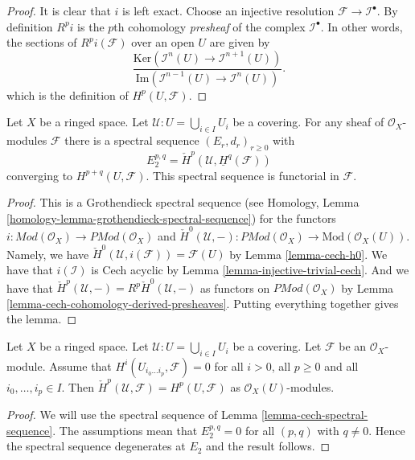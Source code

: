 \begin{proof}
It is clear that $i$ is left exact.
Choose an injective resolution $\mathcal{F} \to \mathcal{I}^\bullet$.
By definition $R^pi$ is the $p$th cohomology {\it presheaf}
of the complex $\mathcal{I}^\bullet$. In other words, the
sections of $R^pi(\mathcal{F})$ over an open $U$ are given by
$$
\frac{\text{Ker}(\mathcal{I}^n(U) \to \mathcal{I}^{n + 1}(U))}
{\text{Im}(\mathcal{I}^{n - 1}(U) \to \mathcal{I}^n(U))}.
$$
which is the definition of $H^p(U, \mathcal{F})$.
\end{proof}

\begin{lemma}
\label{lemma-cech-spectral-sequence}
Let $X$ be a ringed space.
Let $\mathcal{U} : U = \bigcup_{i \in I} U_i$ be a covering.
For any sheaf of $\mathcal{O}_X$-modules $\mathcal{F}$ there
is a spectral sequence $(E_r, d_r)_{r \geq 0}$ with
$$
E_2^{p, q} = \check{H}^p(\mathcal{U}, \underline{H}^q(\mathcal{F}))
$$
converging to $H^{p + q}(U, \mathcal{F})$.
This spectral sequence is functorial in $\mathcal{F}$.
\end{lemma}

\begin{proof}
This is a Grothendieck spectral sequence
(see Homology, Lemma \ref{homology-lemma-grothendieck-spectral-sequence})
for the functors
$i :  \textit{Mod}(\mathcal{O}_X) \to \textit{PMod}(\mathcal{O}_X)$
and
$\check{H}^0(\mathcal{U}, - ) : \textit{PMod}(\mathcal{O}_X)
\to \text{Mod}(\mathcal{O}_X(U))$.
Namely, we have $\check{H}^0(\mathcal{U}, i(\mathcal{F})) = \mathcal{F}(U)$
by Lemma \ref{lemma-cech-h0}. We have that $i(\mathcal{I})$ is 
Cech acyclic by Lemma \ref{lemma-injective-trivial-cech}. And we
have that $\check{H}^p(\mathcal{U}, -) = R^p\check{H}^0(\mathcal{U}, -)$
as functors on $\textit{PMod}(\mathcal{O}_X)$
by Lemma \ref{lemma-cech-cohomology-derived-presheaves}.
Putting everything together gives the lemma.
\end{proof}

\begin{lemma}
\label{lemma-cech-spectral-sequence-application}
Let $X$ be a ringed space.
Let $\mathcal{U} : U = \bigcup_{i \in I} U_i$ be a covering.
Let $\mathcal{F}$ be an $\mathcal{O}_X$-module.
Assume that $H^i(U_{i_0 \ldots i_p}, \mathcal{F}) = 0$
for all $i > 0$, all $p \geq 0$ and all $i_0, \ldots, i_p \in I$.
Then $\check{H}^p(\mathcal{U}, \mathcal{F}) = H^p(U, \mathcal{F})$
as $\mathcal{O}_X(U)$-modules.
\end{lemma}

\begin{proof}
We will use the spectral sequence of
Lemma \ref{lemma-cech-spectral-sequence}.
The assumptions mean that $E_2^{p, q} = 0$ for all $(p, q)$ with
$q \not = 0$. Hence the spectral sequence degenerates at $E_2$
and the result follows.
\end{proof}


